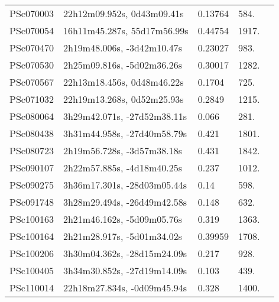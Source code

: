 \begin{longtable}{lllll}
        PSc070003 &     22h12m09.952s, 0d43m09.41s &  0.13764 &           584. &    \citet{2016SDSSD.C...0000:} \\
        PSc070054 &    16h11m45.287s, 55d17m56.99s &  0.44754 &          1917. &    \citet{2016SDSSD.C...0000:} \\
        PSc070470 &     2h19m48.006s, -3d42m10.47s &  0.23027 &           983. &    \citet{2008MNRAS.386..697R} \\
        PSc070530 &     2h25m09.816s, -5d02m36.26s &  0.30017 &          1282. &    \citet{2008MNRAS.386..697R} \\
        PSc070567 &     22h13m18.456s, 0d48m46.22s &   0.1704 &           725. &    \citet{2004SDSS2.C...0000:} \\
        PSc071032 &     22h19m13.268s, 0d52m25.93s &   0.2849 &          1215. &  \citet{2009AandA...495...53L} \\
        PSc080064 &    3h29m42.071s, -27d52m38.11s &    0.066 &           281. &    \citet{2014ApJ...795...44R} \\
        PSc080438 &    3h31m44.958s, -27d40m58.79s &    0.421 &          1801. &    \citet{2004ApJS..155..271S} \\
        PSc080723 &     2h19m56.728s, -3d57m38.18s &    0.431 &          1842. &    \citet{2014ApJ...795...44R} \\
        PSc090107 &     2h22m57.885s, -4d18m40.25s &    0.237 &          1012. &  \citet{2007AandA...474..473G} \\
        PSc090275 &    3h36m17.301s, -28d03m05.44s &     0.14 &           598. &    \citet{2014ApJ...795...44R} \\
        PSc091748 &    3h28m29.494s, -26d49m42.58s &    0.148 &           632. &    \citet{2014ApJ...795...44R} \\
        PSc100163 &     2h21m46.162s, -5d09m05.76s &    0.319 &          1363. &    \citet{2014ApJ...795...44R} \\
        PSc100164 &     2h21m28.917s, -5d01m34.02s &  0.39959 &          1708. &    \citet{2008MNRAS.386..697R} \\
        PSc100206 &    3h30m04.362s, -28d15m24.09s &    0.217 &           928. &    \citet{2014ApJ...795...44R} \\
        PSc100405 &    3h34m30.852s, -27d19m14.09s &    0.103 &           439. &    \citet{2014ApJ...795...44R} \\
        PSc110014 &    22h18m27.834s, -0d09m45.94s &    0.328 &          1400. &  \citet{2009AandA...495...53L} \\

\end{longtable}
